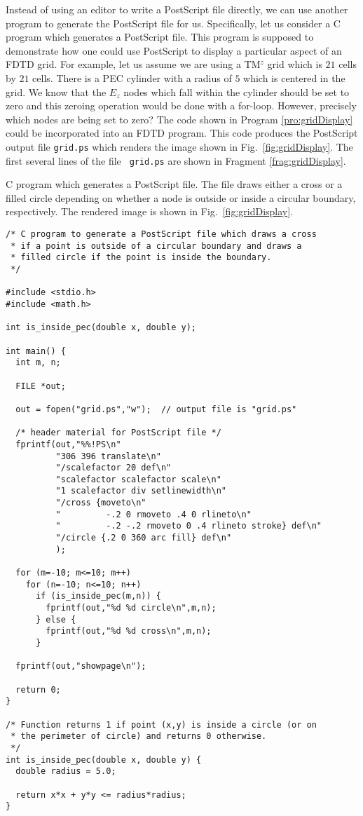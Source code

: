 Instead of using an editor to write a PostScript file directly, we can
use another program to generate the PostScript file for us.
Specifically, let us consider a C program which generates a PostScript
file.  This program is supposed to demonstrate how one could use
PostScript to display a particular aspect of an FDTD grid.  For
example, let us assume we are using a TM$^z$ grid which is $21$ cells
by $21$ cells.  There is a PEC cylinder with a radius of $5$ which is
centered in the grid.  We know that the $E_z$ nodes which fall within
the cylinder should be set to zero and this zeroing operation would be
done with a for-loop.  However, precisely which nodes are being set to
zero?  The code shown in Program \ref{pro:gridDisplay} could be
incorporated into an FDTD program.  This code produces the PostScript
output file {\tt grid.ps} which renders the image shown in Fig.\
\ref{fig:gridDisplay}.  The first several lines of the file {\tt
grid.ps} are shown in Fragment \ref{frag:gridDisplay}.
\begin{program}
C program which generates a PostScript file.  The file draws either a
cross or a filled circle depending on whether a node is outside or
inside a circular boundary, respectively.  The rendered image is shown
in Fig.\ \ref{fig:gridDisplay}.
\label{pro:gridDisplay}
\codemiddle
\begin{lstlisting}
/* C program to generate a PostScript file which draws a cross
 * if a point is outside of a circular boundary and draws a
 * filled circle if the point is inside the boundary.
 */

#include <stdio.h>
#include <math.h>

int is_inside_pec(double x, double y);

int main() {
  int m, n;

  FILE *out;

  out = fopen("grid.ps","w");  // output file is "grid.ps"

  /* header material for PostScript file */
  fprintf(out,"%%!PS\n"
          "306 396 translate\n"
          "/scalefactor 20 def\n"
          "scalefactor scalefactor scale\n"
          "1 scalefactor div setlinewidth\n"
          "/cross {moveto\n"
          "         -.2 0 rmoveto .4 0 rlineto\n"
          "         -.2 -.2 rmoveto 0 .4 rlineto stroke} def\n"
          "/circle {.2 0 360 arc fill} def\n"
          );

  for (m=-10; m<=10; m++)
    for (n=-10; n<=10; n++)
      if (is_inside_pec(m,n)) {
        fprintf(out,"%d %d circle\n",m,n);
      } else {
        fprintf(out,"%d %d cross\n",m,n);
      }

  fprintf(out,"showpage\n");

  return 0;
}

/* Function returns 1 if point (x,y) is inside a circle (or on
 * the perimeter of circle) and returns 0 otherwise.
 */
int is_inside_pec(double x, double y) {
  double radius = 5.0;

  return x*x + y*y <= radius*radius;
}
\end{lstlisting}
\end{program}

